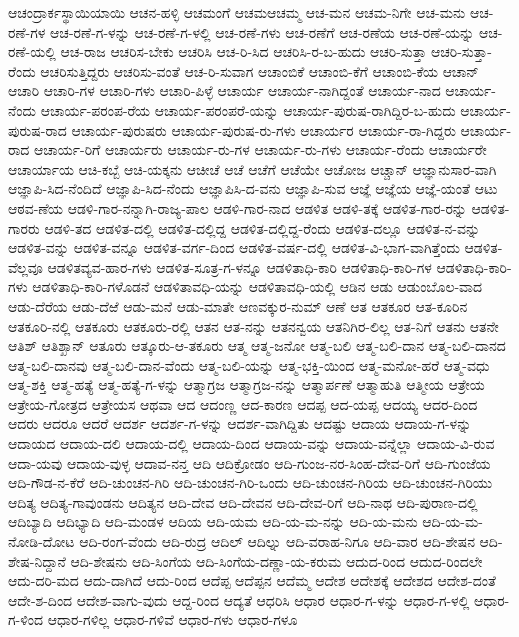 ಆಚಂದ್ರಾರ್ಕಸ್ಥಾಯಿಯಾಯಿ
ಆಚನ-ಹಳ್ಳಿ
ಆಚಮಂಗೆ
ಆಚಮಆಚಮ್ಮ
ಆಚ-ಮನ
ಆಚಮ-ನಿಗೇ
ಆಚ-ಮನು
ಆಚ-ರಣೆ-ಗಳ
ಆಚ-ರಣೆ-ಗ-ಳನ್ನು
ಆಚ-ರಣೆ-ಗ-ಳಲ್ಲಿ
ಆಚ-ರಣೆ-ಗಳು
ಆಚ-ರಣೆಗೆ
ಆಚ-ರಣೆಯ
ಆಚ-ರಣೆ-ಯನ್ನು
ಆಚ-ರಣೆ-ಯಲ್ಲಿ
ಆಚ-ರಾಜ
ಆಚರಿಸ-ಬೇಕು
ಆಚರಿಸಿ
ಆಚ-ರಿ-ಸಿದ
ಆಚರಿಸಿ-ರ-ಬ-ಹುದು
ಆಚರಿ-ಸುತ್ತಾ
ಆಚರಿ-ಸುತ್ತಾ-ರೆಂದು
ಆಚರಿಸುತ್ತಿದ್ದರು
ಆಚರಿಸು-ವಂತೆ
ಆಚ-ರಿ-ಸುವಾಗ
ಆಚಾಂಬಿಕೆ
ಆಚಾಂಬಿ-ಕೆಗೆ
ಆಚಾಂಬಿ-ಕೆಯ
ಆಚಾನ್
ಆಚಾರಿ
ಆಚಾರಿ-ಗಳ
ಆಚಾರಿ-ಗಳು
ಆಚಾರಿ-ಪಿಳ್ಳೆ
ಆಚಾರ್ಯ
ಆಚಾರ್ಯ-ನಾಗಿದ್ದಂತೆ
ಆಚಾರ್ಯ-ನಾದ
ಆಚಾರ್ಯ-ನೆಂದು
ಆಚಾರ್ಯ-ಪರಂಪ-ರೆಯ
ಆಚಾರ್ಯ-ಪರಂಪರೆ-ಯನ್ನು
ಆಚಾರ್ಯ-ಪುರುಷ-ರಾಗಿದ್ದಿರ-ಬ-ಹುದು
ಆಚಾರ್ಯ-ಪುರುಷ-ರಾದ
ಆಚಾರ್ಯ-ಪುರುಷರು
ಆಚಾರ್ಯ-ಪುರುಷ-ರು-ಗಳು
ಆಚಾರ್ಯರ
ಆಚಾರ್ಯ-ರಾ-ಗಿದ್ದರು
ಆಚಾರ್ಯ-ರಾದ
ಆಚಾರ್ಯ-ರಿಗೆ
ಆಚಾರ್ಯರು
ಆಚಾರ್ಯ-ರು-ಗಳ
ಆಚಾರ್ಯ-ರು-ಗಳು
ಆಚಾರ್ಯ-ರೆಂದು
ಆಚಾರ್ಯರೇ
ಆಚಾರ್ಯಾಯ
ಆಚಿ-ಕಬ್ಬೆ
ಆಚಿ-ಯಕ್ಕನು
ಆಚೀಚೆ
ಆಚೆ
ಆಚೆಗೆ
ಆಚೆಯೇ
ಆಚೋಜ
ಆಚ್ಚಾನ್
ಆಜ್ಞಾನುಸಾರ-ವಾಗಿ
ಆಜ್ಞಾಪಿ-ಸಿದ-ನೆಂದಿದೆ
ಆಜ್ಞಾಪಿ-ಸಿದ-ನೆಂದು
ಆಜ್ಞಾಪಿಸಿ-ದ-ವನು
ಆಜ್ಞಾಪಿ-ಸುವ
ಆಜ್ಞೆ
ಆಜ್ಞೆಯ
ಆಜ್ಞೆ-ಯಂತೆ
ಆಟು
ಆಠವ-ಣೆಯ
ಆಡಳಿ-ಗಾರ-ನನ್ನಾಗಿ-ರಾಜ್ಯ-ಪಾಲ
ಆಡಳಿ-ಗಾರ-ನಾದ
ಆಡಳಿತ
ಆಡಳಿ-ತಕ್ಕೆ
ಆಡಳಿತ-ಗಾರ-ರನ್ನು
ಆಡಳಿತ-ಗಾರರು
ಆಡಳಿ-ತದ
ಆಡಳಿತ-ದಲ್ಲಿ
ಆಡಳಿತ-ದಲ್ಲಿದ್ದ
ಆಡಳಿತ-ದಲ್ಲಿದ್ದ-ರೆಂದು
ಆಡಳಿತ-ದಲ್ಲೂ
ಆಡಳಿತ-ನ-ವನ್ನು
ಆಡಳಿತ-ವನ್ನು
ಆಡಳಿತ-ವನ್ನೂ
ಆಡಳಿತ-ವರ್ಗ-ದಿಂದ
ಆಡಳಿತ-ವರ್ಷ-ದಲ್ಲಿ
ಆಡಳಿತ-ವಿ-ಭಾಗ-ವಾಗಿತ್ತೆಂದು
ಆಡಳಿತ-ವೆಲ್ಲವೂ
ಆಡಳಿತವ್ಯವ-ಹಾರ-ಗಳು
ಆಡಳಿತ-ಸೂತ್ರ-ಗ-ಳನ್ನೂ
ಆಡಳಿತಾಧಿ-ಕಾರಿ
ಆಡಳಿತಾಧಿ-ಕಾರಿ-ಗಳ
ಆಡಳಿತಾಧಿ-ಕಾರಿ-ಗಳು
ಆಡಳಿತಾಧಿ-ಕಾರಿ-ಗಳೊಡನೆ
ಆಡಳಿತಾವಧಿ-ಯನ್ನು
ಆಡಳಿತಾವಧಿ-ಯಲ್ಲಿ
ಆಡಿನ
ಆಡು
ಆಡುಂಬೊಲ-ವಾದ
ಆಡು-ದೆರೆಯ
ಆಡು-ದೆಱೆ
ಆಡು-ಮನೆ
ಆಡು-ಮಾತೇ
ಆಣವಕ್ಕುರ-ನುಮ್
ಆಣೆ
ಆತ
ಆತಕೂರ
ಆತ-ಕೂರಿನ
ಆತಕೂರಿ-ನಲ್ಲಿ
ಆತಕೂರು
ಆತಕೂರು-ರಲ್ಲಿ
ಆತನ
ಆತ-ನನ್ನು
ಆತನನ್ವಯ
ಆತನಿಗಿರ-ಲಿಲ್ಲ
ಆತ-ನಿಗೆ
ಆತನು
ಆತನೇ
ಆತಿಶ್
ಆತಿಶ್ಖಾನ್
ಆತೂರು
ಆತ್ಕೂರು-ಆ-ತಕೂರು
ಆತ್ಮ
ಆತ್ಮ-ಜನೋ
ಆತ್ಮ-ಬಲಿ
ಆತ್ಮ-ಬಲಿ-ದಾನ
ಆತ್ಮ-ಬಲಿ-ದಾನದ
ಆತ್ಮ-ಬಲಿ-ದಾನವು
ಆತ್ಮ-ಬಲಿ-ದಾನ-ವೆಂದು
ಆತ್ಮ-ಬಲಿ-ಯನ್ನು
ಆತ್ಮ-ಭಕ್ತಿ-ಯಿಂದ
ಆತ್ಮ-ಮನೋ-ಹರೆ
ಆತ್ಮ-ವಧು
ಆತ್ಮ-ಶಕ್ತಿ
ಆತ್ಮ-ಹತ್ಯೆ
ಆತ್ಮ-ಹತ್ಯೆ-ಗ-ಳನ್ನು
ಆತ್ಮಾಗ್ರಜ
ಆತ್ಮಾಗ್ರಜ-ನನ್ನು
ಆತ್ಮಾರ್ಪಣೆ
ಆತ್ಮಾಹುತಿ
ಆತ್ಮೀಯ
ಆತ್ರೇಯ
ಆತ್ರೇಯ-ಗೋತ್ರದ
ಆತ್ರೇಯಸ
ಆಥವಾ
ಆದ
ಆದಂಣ್ಣ
ಆದ-ಕಾರಣ
ಆದಪ್ಪ
ಆದ-ಯಪ್ಪ
ಆದಯ್ಯ
ಆದರ-ದಿಂದ
ಆದರು
ಆದರೂ
ಆದರೆ
ಆದರ್ಶ
ಆದರ್ಶ-ಗ-ಳನ್ನು
ಆದರ್ಶ-ವಾಗಿದ್ದಿತು
ಆದಷ್ಟು
ಆದಾಯ
ಆದಾಯ-ಗ-ಳನ್ನು
ಆದಾಯದ
ಆದಾಯ-ದಲಿ
ಆದಾಯ-ದಲ್ಲಿ
ಆದಾಯ-ದಿಂದ
ಆದಾಯ-ವನ್ನು
ಆದಾಯ-ವನ್ನೆಲ್ಲಾ
ಆದಾಯ-ವಿ-ರುವ
ಆದಾ-ಯವು
ಆದಾಯ-ವುಳ್ಳ
ಆದಾವ-ನನ್ತ
ಆದಿ
ಆದಿಕ್ರೋಡಂ
ಆದಿ-ಗುಂಜ-ನರ-ಸಿಂಹ-ದೇವ-ರಿಗೆ
ಆದಿ-ಗುಂಜೆಯ
ಆದಿ-ಗೌಡ-ನ-ಕೆರೆ
ಆದಿ-ಚುಂಚನ-ಗಿರಿ
ಆದಿ-ಚುಂಚನ-ಗಿರಿ-ಒಂದು
ಆದಿ-ಚುಂಚನ-ಗಿರಿಯ
ಆದಿ-ಚುಂಚನ-ಗಿರಿಯು
ಆದಿತ್ಯ
ಆದಿತ್ಯ-ಗಾವುಂಡನು
ಆದಿತ್ಯನ
ಆದಿ-ದೇವ
ಆದಿ-ದೇವನ
ಆದಿ-ದೇವ-ರಿಗೆ
ಆದಿ-ನಾಥ
ಆದಿ-ಪುರಾಣ-ದಲ್ಲಿ
ಆದಿಬ್ಯಾದಿ
ಆದಿಭ್ಯಾದಿ
ಆದಿ-ಮಂಡಳ
ಆದಿಯ
ಆದಿ-ಯಮ
ಆದಿ-ಯ-ಮ-ನನ್ನು
ಆದಿ-ಯ-ಮನು
ಆದಿ-ಯ-ಮ-ನೋಡಿ-ದೋಟ
ಆದಿ-ರಂಗ-ವೆಂದು
ಆದಿ-ರುದ್ರ
ಆದಿಲ್
ಆದಿಲ್ನು
ಆದಿ-ವರಾಹ-ನಿಗೂ
ಆದಿ-ವಾರ
ಆದಿ-ಶೇಷನ
ಆದಿ-ಶೇಷ-ನಿದ್ದಾನೆ
ಆದಿ-ಶೇಷನು
ಆದಿ-ಸಿಂಗೆಯ
ಆದಿ-ಸಿಂಗೆಯ-ದಣ್ಣಾ-ಯ-ಕರುಮ
ಆದುದ-ರಿಂದ
ಆದುದ-ರಿಂದಲೇ
ಆದು-ದರಿ-ಮದ
ಆದು-ದಾಗಿದೆ
ಆದು-ರಿಂದ
ಆದೆಪ್ಪ
ಆದೆಪ್ಪನ
ಆದೆಮ್ಮ
ಆದೇಶ
ಆದೇಶಕ್ಕೆ
ಆದೇಶದ
ಆದೇಶ-ದಂತೆ
ಆದೇ-ಶ-ದಿಂದ
ಆದೇಶ-ವಾಗು-ವುದು
ಆದ್ದ-ರಿಂದ
ಆದ್ಯತೆ
ಆಧರಿಸಿ
ಆಧಾರ
ಆಧಾರ-ಗ-ಳನ್ನು
ಆಧಾರ-ಗ-ಳಲ್ಲಿ
ಆಧಾರ-ಗ-ಳಿಂದ
ಆಧಾರ-ಗಳಿಲ್ಲ
ಆಧಾರ-ಗಳಿವೆ
ಆಧಾರ-ಗಳು
ಆಧಾರ-ಗಳೂ
